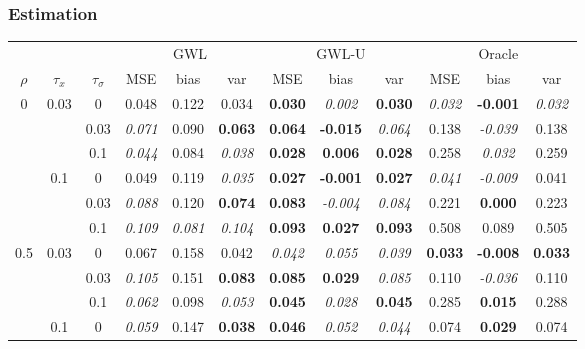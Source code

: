 \documentclass[authoryear, review, 11pt]{elsarticle}
\begin{document}
		\subsubsection{Estimation}
		\begin{table}[ht]
		\begin{center}
		\begin{tabular}{ccc | ccc | ccc | ccc }
		&&&\multicolumn{3}{c}{GWL}&\multicolumn{3}{c}{GWL-U}&\multicolumn{3}{c}{Oracle}\\
		$\rho$ & $\tau_x$ & $\tau_\sigma$ & MSE & bias & var &  MSE & bias & var &  MSE & bias & var\\   \hline
		\multirow{6}{*}{0} & \multirow{3}{*}{0.03} & 0 & 0.048 & 0.122 & 0.034 & \textbf{0.030} & \emph{0.002} & \textbf{0.030} & \emph{0.032} & \textbf{-0.001} & \emph{0.032} \\ 
		 &  & 0.03 &   \emph{0.071} & 0.090 & \textbf{0.063} & \textbf{0.064} & \textbf{-0.015} & \emph{0.064} & 0.138 & \emph{-0.039} & 0.138 \\ 
		 &  & 0.1 &   \emph{0.044} & 0.084 & \emph{0.038} & \textbf{0.028} & \textbf{0.006} & \textbf{0.028} & 0.258 & \emph{0.032} & 0.259 \\ \cline{2-12}
		 & \multirow{3}{*}{0.1} & 0 &   0.049 & 0.119 & \emph{0.035} & \textbf{0.027} & \textbf{-0.001} & \textbf{0.027} & \emph{0.041} & \emph{-0.009} & 0.041 \\ 
		 &  & 0.03 &   \emph{0.088} & 0.120 & \textbf{0.074} & \textbf{0.083} & \emph{-0.004} & \emph{0.084} & 0.221 & \textbf{0.000} & 0.223 \\ 
		 &  & 0.1 &   \emph{0.109} & \emph{0.081} & \emph{0.104} & \textbf{0.093} & \textbf{0.027} & \textbf{0.093} & 0.508 & 0.089 & 0.505 \\ \cline{1-12}
		\multirow{6}{*}{0.5} & \multirow{3}{*}{0.03} & 0 &   0.067 & 0.158 & 0.042 & \emph{0.042} & \emph{0.055} & \emph{0.039} & \textbf{0.033} & \textbf{-0.008} & \textbf{0.033} \\ 
		 &  & 0.03 &   \emph{0.105} & 0.151 & \textbf{0.083} & \textbf{0.085} & \textbf{0.029} & \emph{0.085} & 0.110 & \emph{-0.036} & 0.110 \\ 
		 &  & 0.1 &   \emph{0.062} & 0.098 & \emph{0.053} & \textbf{0.045} & \emph{0.028} & \textbf{0.045} & 0.285 & \textbf{0.015} & 0.288 \\ \cline{2-12}
		 & \multirow{3}{*}{0.1} & 0 &   \emph{0.059} & 0.147 & \textbf{0.038} & \textbf{0.046} & \emph{0.052} & \emph{0.044} & 0.074 & \textbf{0.029} & 0.074 \\ 

\end{tabular}
\end{center}
\end{table}
\end{document}
